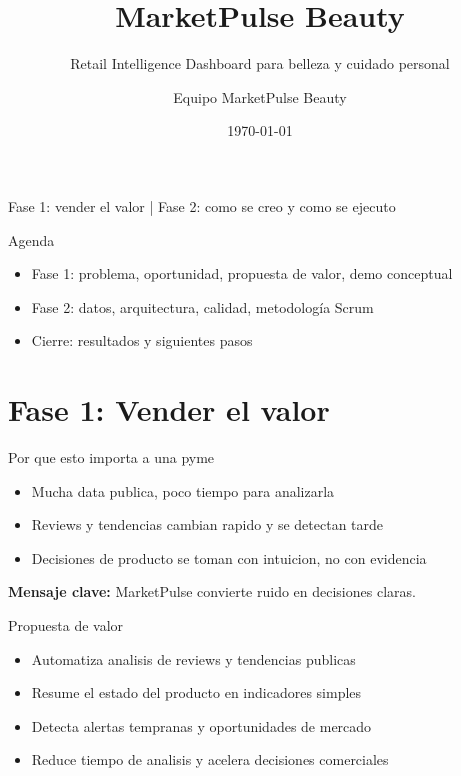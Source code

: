 \documentclass[aspectratio=169]{beamer}
\title{MarketPulse Beauty}
\subtitle{Retail Intelligence Dashboard para belleza y cuidado personal}
\author{Equipo MarketPulse Beauty}
\date{\today}
\begin{document}
\begin{frame}
  \titlepage
  \vspace{0.2cm}
  \begin{center}
    Fase 1: vender el valor \quad | \quad Fase 2: como se creo y como se ejecuto
  \end{center}
\end{frame}

\begin{frame}{Agenda}
  \begin{itemize}
    \item Fase 1: problema, oportunidad, propuesta de valor, demo conceptual
    \item Fase 2: datos, arquitectura, calidad, metodolog\'ia Scrum
    \item Cierre: resultados y siguientes pasos
  \end{itemize}
\end{frame}

\section{Fase 1: Vender el valor}

\begin{frame}{Por que esto importa a una pyme}
  \begin{itemize}
    \item Mucha data publica, poco tiempo para analizarla
    \item Reviews y tendencias cambian rapido y se detectan tarde
    \item Decisiones de producto se toman con intuicion, no con evidencia
  \end{itemize}
  \vspace{0.2cm}
  \textbf{Mensaje clave:} MarketPulse convierte ruido en decisiones claras.
\end{frame}

\begin{frame}{Propuesta de valor}
  \begin{itemize}
    \item Automatiza analisis de reviews y tendencias publicas
    \item Resume el estado del producto en indicadores simples
    \item Detecta alertas tempranas y oportunidades de mercado
    \item Reduce tiempo de analisis y acelera decisiones comerciales
  \end{itemize}
\end{frame}
\end{document}
